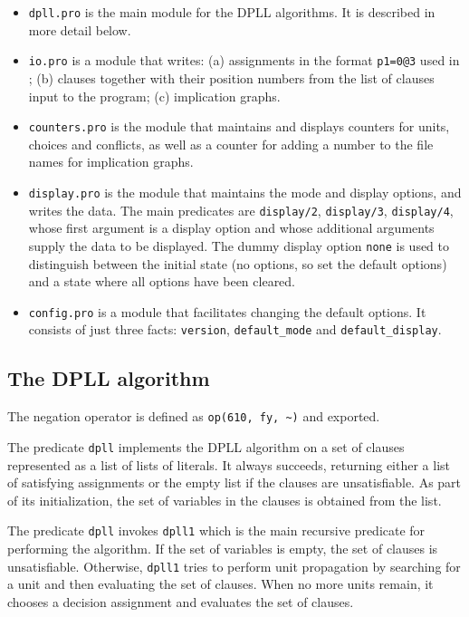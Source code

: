 \documentclass[11pt]{article}
\newcommand*{\p}[1]{\textup{\texttt{#1}}}
\begin{document}
\begin{itemize}
\item \p{dpll.pro} is the main module for the DPLL algorithms. It is
described in more detail below.

\item \p{io.pro} is a module that writes: (a) assignments in the format
\p{p1=0@3} used in \cite{mlm}; (b) clauses together with their position
numbers from the list of clauses input to the program; (c) implication
graphs.

\item \p{counters.pro} is the module that maintains and displays counters
for units, choices and conflicts, as well as a counter for adding a
number to the file names for implication graphs.

\item \p{display.pro} is the module that maintains the mode and display
options, and writes the data. The main predicates are \p{display/2},
\p{display/3}, \p{display/4}, whose first argument is a display option
and whose additional arguments supply the data to be displayed. The
dummy display option \p{none} is used to distinguish between the initial
state (no options, so set the default options) and a state where all
options have been cleared.

\item \p{config.pro} is a module that facilitates changing the default
options. It consists of just three facts: \p{version}, \p{default\_mode}
and \p{default\_display}.

\end{itemize}

\subsection{The DPLL algorithm}

The negation operator is defined as \verb+op(610, fy, ~)+ and exported.

The predicate \p{dpll} implements the DPLL algorithm on a set of clauses
represented as a list of lists of literals. It always succeeds,
returning either a list of satisfying assignments or the empty list if
the clauses are unsatisfiable. As part of its initialization, the set of
variables in the clauses is obtained from the list. 

The predicate \p{dpll} invokes \p{dpll1} which is the main recursive
predicate for performing the algorithm. If the set of variables is
empty, the set of clauses is unsatisfiable. Otherwise, \p{dpll1} tries
to perform unit propagation by searching for a unit and then evaluating
the set of clauses. When no more units remain, it chooses a decision
assignment and evaluates the set of clauses.
\end{document}
